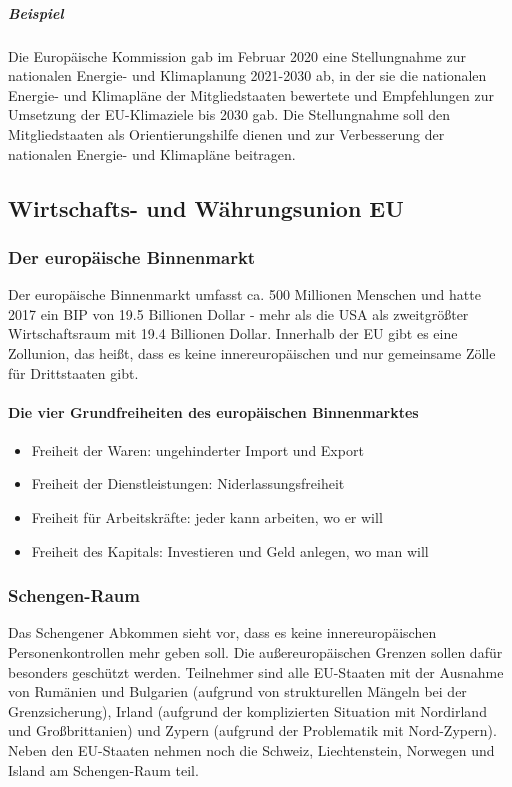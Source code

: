 \documentclass{article}
\begin{document}
	\subparagraph{Beispiel}
	Die Europäische Kommission gab im Februar 2020 eine Stellungnahme zur nationalen Energie- und Klimaplanung 2021-2030 ab, in der sie die nationalen Energie- und Klimapläne der Mitgliedstaaten bewertete und Empfehlungen zur Umsetzung der EU-Klimaziele bis 2030 gab. Die Stellungnahme soll den Mitgliedstaaten als Orientierungshilfe dienen und zur Verbesserung der nationalen Energie- und Klimapläne beitragen.

	\subsection{Wirtschafts- und Währungsunion EU}
	\subsubsection{Der europäische Binnenmarkt}
	Der europäische Binnenmarkt umfasst ca. 500 Millionen Menschen und hatte 2017 ein BIP von 19.5 Billionen Dollar - mehr als die USA als zweitgrößter Wirtschaftsraum mit 19.4 Billionen Dollar. Innerhalb der EU gibt es eine Zollunion, das heißt, dass es keine innereuropäischen und nur gemeinsame Zölle für Drittstaaten gibt.

	\paragraph{Die vier Grundfreiheiten des europäischen Binnenmarktes}
	\begin{itemize}
		\item Freiheit der Waren: ungehinderter Import und Export
		\item Freiheit der Dienstleistungen: Niderlassungsfreiheit
		\item Freiheit für Arbeitskräfte: jeder kann arbeiten, wo er will
		\item Freiheit des Kapitals: Investieren und Geld anlegen, wo man will
	\end{itemize}

	\subsubsection{Schengen-Raum}
	Das Schengener Abkommen sieht vor, dass es keine innereuropäischen Personenkontrollen mehr geben soll. Die außereuropäischen Grenzen sollen dafür besonders geschützt werden. Teilnehmer sind alle EU-Staaten mit der Ausnahme von Rumänien und Bulgarien (aufgrund von strukturellen Mängeln bei der Grenzsicherung), Irland (aufgrund der komplizierten Situation mit Nordirland und Großbrittanien) und Zypern (aufgrund der Problematik mit Nord-Zypern). Neben den EU-Staaten nehmen noch die Schweiz, Liechtenstein, Norwegen und Island am Schengen-Raum teil.
\end{document}
